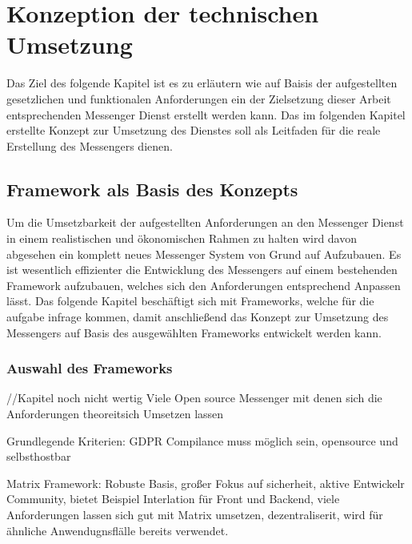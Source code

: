 \chapter{Konzeption der technischen Umsetzung}\label{chapter:tanforderungen}
Das Ziel des folgende Kapitel ist es zu erläutern wie auf Baisis der aufgestellten gesetzlichen und funktionalen Anforderungen ein der Zielsetzung dieser Arbeit entsprechenden Messenger Dienst erstellt werden kann. Das im folgenden Kapitel erstellte Konzept zur Umsetzung des Dienstes soll als Leitfaden für die reale Erstellung des Messengers dienen. 

\section{Framework als Basis des Konzepts}\label{chapter:kr}
Um die Umsetzbarkeit der aufgestellten Anforderungen an den Messenger Dienst in einem realistischen und ökonomischen Rahmen zu halten wird davon abgesehen ein komplett neues Messenger System von Grund auf Aufzubauen. Es ist wesentlich effizienter die Entwicklung des Messengers auf einem bestehenden Framework aufzubauen, welches sich den Anforderungen entsprechend Anpassen lässt. Das folgende Kapitel beschäftigt sich mit Frameworks, welche für die aufgabe infrage kommen, damit anschließend das Konzept zur Umsetzung des Messengers auf Basis des ausgewählten Frameworks entwickelt werden kann. 

\subsection{Auswahl des Frameworks}\label{chapter:am}
//Kapitel noch nicht wertig
Viele Open source Messenger mit denen sich die Anforderungen theoreitsich Umsetzen lassen

Grundlegende Kriterien: GDPR Compilance muss möglich sein, opensource und selbsthostbar

Matrix Framework: Robuste Basis, großer Fokus auf sicherheit, aktive Entwickelr Community, bietet Beispiel Interlation für Front und Backend, viele Anforderungen lassen sich gut mit Matrix umsetzen, dezentraliserit, wird für ähnliche Anwendugnsflälle bereits verwendet.

